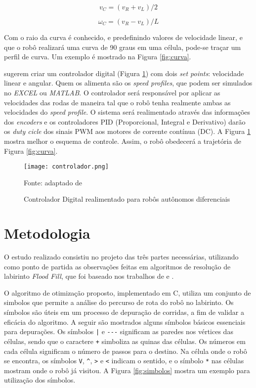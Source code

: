 \begin{equation}
	\label{eq:veloc_v}
	v_C 	=	(v_R + v_L)/2
\end{equation}

\begin{equation}
	\label{eq:veloc_w}
	\omega_C 	=	(v_R - v_L)/L
\end{equation}

Com o raio da curva é conhecido, e predefinindo valores de velocidade linear, e que o robô realizará uma curva de 90 graus em uma célula, pode-se traçar um perfil de curva. Um exemplo é mostrado na Figura \ref{fig:curva}.

 sugerem criar um controlador digital (Figura \ref{fig:controlador}) com dois \emph{set points}: velocidade linear e angular. Quem os alimenta são os \emph{speed profiles}, que podem ser simulados no \textit{EXCEL} ou \textit{MATLAB}. O controlador será responsável por aplicar as velocidades das rodas de maneira tal que o robô tenha realmente ambas as velocidades do \textit{speed profile}. O sistema será realimentado através das informações dos \emph{encoders} e os controladores {PID} (Proporcional, Integral e Derivativo) darão os \emph{duty cicle} dos sinais {PWM} aos motores de corrente contínua (DC). A Figura \ref{fig:controlador} mostra melhor o esquema de controle.  Assim, o robô obedecerá a trajetória de Figura \ref{fig:curva}.

\begin{figure}[!htb]
	\caption{\label{fig:controlador}Controlador Digital realimentado para robôs autônomos diferenciais}
	\begin{center}
		\texttt{[image: controlador.png]}
	\end{center}
	\centering
	\small Fonte: adaptado de 
\end{figure}


\section{Metodologia}
O estudo realizado consistiu no projeto das três partes necessárias, utilizando como ponto de partida as observações feitas em algoritmos de resolução de labirinto \emph{Flood Fill}, que foi baseado nos trabalhos de  e . 

O algoritmo de otimização proposto, implementado em C, utiliza um conjunto de simbolos que permite a análise do percurso de rota do robô no labirinto. Os símbolos são úteis em um processo de depuração de corridas, a fim de validar a eficácia do algoritmo. A seguir são mostrados alguns símbolos básicos essenciais para depurações. Os símbolos \verb+|+ e \verb+---+ significam as paredes nos vértices das células, sendo que o caractere \texttt{+} simboliza as quinas das células. Os números em cada célula significam o número de passos para o destino. Na célula onde o robô se encontra, os símbolos \texttt{V}, \texttt{\^}, \texttt{>} e \texttt{<} indicam o sentido, e o símbolo \texttt{*} nas células mostram onde o robô já visitou. A Figura \ref{fig:simbolos} mostra um exemplo para utilização dos símbolos.


